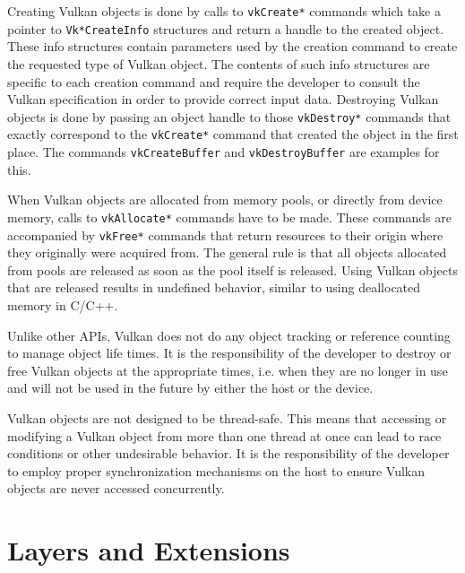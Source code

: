 
    Creating Vulkan objects is done by calls to \lstinline{vkCreate*} commands which take a pointer to \lstinline{Vk*CreateInfo} structures and return a handle to the created object. These info structures contain parameters used by the creation command to create the requested type of Vulkan object. The contents of such info structures are specific to each creation command and require the developer to consult the Vulkan specification in order to provide correct input data. Destroying Vulkan objects is done by passing an object handle to those \lstinline{vkDestroy*} commands that exactly correspond to the \lstinline{vkCreate*} command that created the object in the first place. The commands \lstinline{vkCreateBuffer} and \lstinline{vkDestroyBuffer} are examples for this.

    When Vulkan objects are allocated from memory pools, or directly from device memory, calls to \lstinline{vkAllocate*} commands have to be made. These commands are accompanied by \lstinline{vkFree*} commands that return resources to their origin where they originally were acquired from. The general rule is that all objects allocated from pools are released as soon as the pool itself is released. Using Vulkan objects that are released results in undefined behavior, similar to using deallocated memory in C/C++.

    Unlike other APIs, Vulkan does not do any object tracking or reference counting to manage object life times. It is the responsibility of the developer to destroy or free Vulkan objects at the appropriate times, i.e. when they are no longer in use and will not be used in the future by either the host or the device.

    Vulkan objects are not designed to be thread-safe. This means that accessing or modifying a Vulkan object from more than one thread at once can lead to race conditions or other undesirable behavior. It is the responsibility of the developer to employ proper synchronization mechanisms on the host to ensure Vulkan objects are never accessed concurrently.

  \section{Layers and Extensions}
  \label{sec:LayersAndExtensions}


